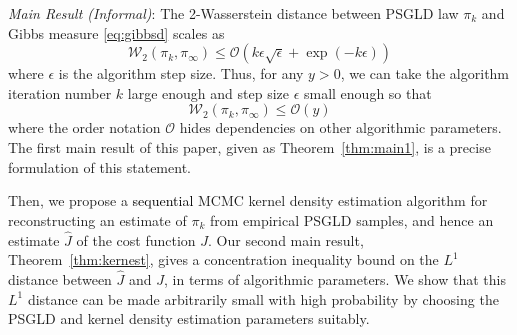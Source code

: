 \documentclass[journal,onecolumn]{IEEEtran}
\newcommand{\step}{\epsilon}
\newcommand{\rew}{J}
\newcommand{\wass}{\mathcal{W}_2}
\newcommand{\gibbs}{\ids_{\infty}}
\newcommand{\dtlaw}{\ids_{k}} %
\newcommand{\ids}{\pi}
\newcommand{\idw}{\gamma}
\newcommand{\ksp}{k,\idw}
\newcommand{\hlb}{y} %
\begin{document}
\vspace{0.1cm}
\textit{Main Result (Informal)}: The 2-Wasserstein distance between PSGLD law $\dtlaw$ and Gibbs measure \eqref{eq:gibbsd} scales as 
\[\wass(\dtlaw,\gibbs) \leq \mathcal{O}(k\step\sqrt{\step} + \exp(-k\step))\]
where $\step$ is the algorithm step size. Thus, for any $\hlb>0$, we can take the algorithm iteration number $k$ large enough and step size $\step$ small enough so that 
\[\wass(\dtlaw,\gibbs) \leq \mathcal{O}(\hlb)\]
where the order notation $\mathcal{O}$ hides dependencies on other algorithmic parameters. The {\color{black}first} main result of this paper, given as Theorem~\ref{thm:main1}, is a precise formulation of this statement.

{\color{black} Then, we propose a \textcolor{black}{sequential} MCMC kernel density estimation algorithm for reconstructing an estimate of $\dtlaw$ from empirical PSGLD samples, and hence an estimate $\hat{\rew}$ of the cost function $\rew$. Our second main result, Theorem~\ref{thm:kernest}, gives a concentration inequality bound on the $L^1$ distance between $\hat{J}$ and $J$, in terms of algorithmic parameters. We show that this $L^1$ distance can be made arbitrarily small with high probability by choosing the PSGLD and kernel density estimation parameters suitably.}
\vspace{0.1cm}


\end{document}
